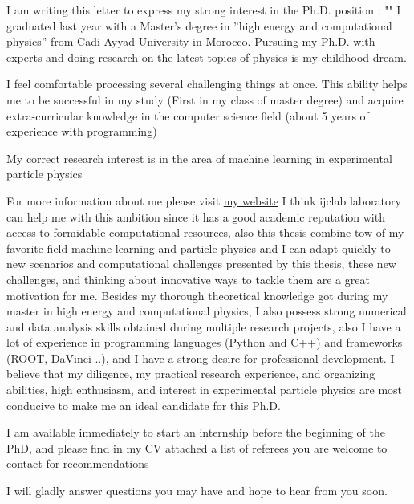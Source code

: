 \begin{cvletter}
I am writing this letter to express my strong interest in the Ph.D. position : "\thesis"
I graduated last year with a Master’s degree in ”high energy and computational physics” from Cadi Ayyad University in Morocco. Pursuing my Ph.D. with experts and doing research on the latest topics of physics is my childhood dream.

I feel comfortable processing several challenging things at once. This ability helps me to be successful in my study (First in my class of master degree) and acquire extra-curricular knowledge in the computer science field (about 5 years of experience with programming)

My correct research interest is in the area of machine learning in experimental particle physics

For more information about me please visit \href{http://ismailezzaki.me/}{my website}
I think ijclab laboratory can help me with this ambition since it has a good academic reputation with access to formidable computational resources, also this thesis combine tow of my favorite field machine learning and particle physics and I can adapt quickly to new scenarios and computational challenges presented by this thesis, these new challenges, and thinking about innovative ways to tackle them are a great motivation for me.
Besides my thorough theoretical knowledge got during my master in high energy and computational physics, I also possess strong numerical and data analysis skills obtained during multiple research projects, also I have a lot of experience in programming languages (Python and C++) and frameworks (ROOT, DaVinci ..), and I have a strong desire for professional development. I believe that my diligence, my practical research experience, and organizing abilities, high enthusiasm, and interest in experimental particle physics are most conducive to make me an ideal candidate for this Ph.D.

I am available immediately to start an internship before the beginning of the PhD, and please find in my CV attached a list of referees you are welcome to contact for recommendations

I will gladly answer questions you may have and hope to hear from you soon.
\end{cvletter}


\makeletterclosing


